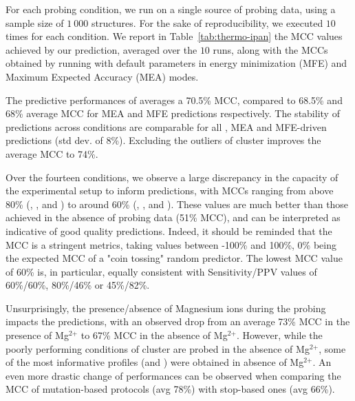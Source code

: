 \documentclass[a4,center,fleqn]{NAR}
\begin{document}
For each probing condition, we run \OurTool{} on a single source of probing data, using a sample size of $1~000$ structures. For the sake of reproducibility, we executed \OurTool{} $10$ times for each condition. We report in Table~\ref{tab:thermo-ipan} the MCC values achieved by our prediction, averaged over the $10$ runs, along with the MCCs obtained by running  with default parameters in energy minimization (MFE) and Maximum Expected Accuracy (MEA) modes.


The predictive performances of \OurTool averages a 70.5\% MCC, compared to 68.5\% and 68\% average MCC for MEA and MFE predictions respectively. The stability of predictions across conditions are comparable for all \OurTool, MEA and MFE-driven predictions (std dev. of 8\%). Excluding the outliers of cluster  improves the average MCC to 74\%.

Over the fourteen conditions, we observe a large discrepancy in the capacity of the experimental setup to inform predictions, with MCCs ranging from above 80\% (\NMIA, \NMIAMg, \OneMSevILU and \OneMSevILUMg) to around 60\% (\NAICE, \BzCN, \OneMSevCE and \NMIACE). These values are much better than those achieved in the absence of probing data (51\% MCC), and can be interpreted as indicative of good quality predictions. Indeed, it should be reminded that the MCC is a stringent metrics, taking values between -100\% and 100\%, 0\% being the expected MCC of a "coin tossing" random predictor. The lowest MCC value of 60\% is, in particular, equally consistent with Sensitivity/PPV values of 60\%/60\%, 80\%/46\% or 45\%/82\%.

Unsurprisingly, the presence/absence of Magnesium ions during the probing impacts the predictions, with an observed drop from an average 73\% MCC in the presence of Mg$^\text{2+}$ to 67\% MCC in the absence of Mg$^\text{2+}$. However, while the poorly performing conditions of cluster  are probed in the absence of Mg$^\text{2+}$, some of the most informative profiles (\OneMSevILU and \NMIA) were obtained in absence of Mg$^\text{2+}$.
An even more drastic change of performances can be observed when comparing the MCC of mutation-based protocols (avg 78\%) with stop-based ones (avg 66\%). 
\end{document}
